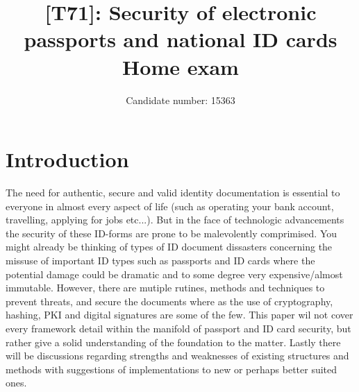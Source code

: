\documentclass[12pt,
               a4paper,
               article,
               oneside,
               oldfontcommands,
               english]{memoir}
\title{ [T71]: Security of electronic passports and national ID cards\\
[0.25in]
\normalsize Home exam}
\author{Candidate number: 15363}
\begin{document}
\maketitle
\section*{Introduction}
The need for authentic, secure and valid identity documentation is essential to everyone in almost every aspect of life (such as operating your bank account, travelling, applying for jobs etc...). But in the face of technologic advancements the security of these ID-forms are prone to be malevolently comprimised. You might already be thinking of types of ID document dissasters concerning the missuse of important ID types such as passports and ID cards where the potential damage could be dramatic and to some degree very expensive/almost immutable. However, there are mutiple rutines, methods and techniques to prevent threats, and secure the documents where as the use of cryptography, hashing, PKI and digital signatures are some of the few. This paper wil not cover every framework detail within the manifold of passport and ID card security, but rather give a solid understanding of the foundation to the matter. Lastly there will be discussions regarding strengths and weaknesses of existing structures and methods with suggestions of implementations to new or perhaps better suited ones.
\end{document}
